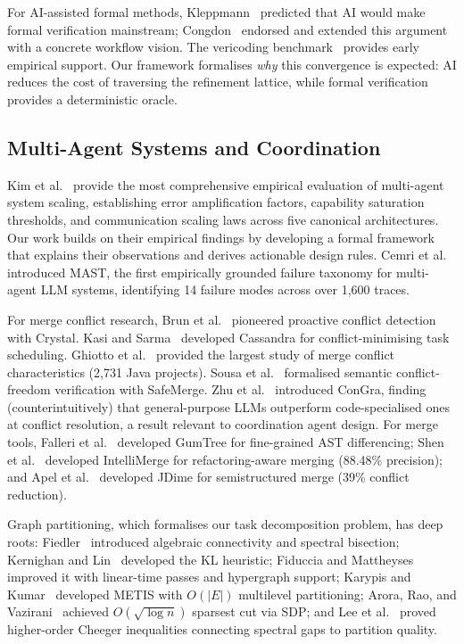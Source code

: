 \documentclass[11pt, a4paper]{googledeepmind}
\begin{document}
For AI-assisted formal methods, Kleppmann~\citep{kleppmann2025formal} predicted
that AI would make formal verification mainstream;
Congdon~\citep{congdon2025formal} endorsed and extended this argument with a
concrete workflow vision.  The vericoding benchmark~\citep{vericoding2025}
provides early empirical support.  Our framework formalises \emph{why} this
convergence is expected: AI reduces the cost of traversing the refinement
lattice, while formal verification provides a deterministic oracle.


\subsection{Multi-Agent Systems and Coordination}

Kim et al.~\citep{kim2025scaling} provide the most comprehensive empirical
evaluation of multi-agent system scaling, establishing error amplification
factors, capability saturation thresholds, and communication scaling laws across
five canonical architectures.  Our work builds on their empirical findings by
developing a formal framework that explains their observations and derives
actionable design rules.  Cemri et al.~\citep{cemri2025multiagent} introduced MAST, the
first empirically grounded failure taxonomy for multi-agent LLM systems,
identifying 14 failure modes across over 1,600 traces.

For merge conflict research, Brun et al.~\citep{Brun2011} pioneered proactive
conflict detection with Crystal.  Kasi and Sarma~\citep{KasiSarma2013}
developed Cassandra for conflict-minimising task scheduling.  Ghiotto
et al.~\citep{Ghiotto2018} provided the largest study of merge conflict
characteristics (2,731 Java projects).  Sousa et al.~\citep{Sousa2018}
formalised semantic conflict-freedom verification with SafeMerge.  Zhu
et al.~\citep{Zhu2024congra} introduced ConGra, finding (counterintuitively)
that general-purpose LLMs outperform code-specialised ones at conflict
resolution, a result relevant to coordination agent design.  For merge tools,
Falleri et al.~\citep{Falleri2014} developed GumTree for fine-grained AST
differencing; Shen et al.~\citep{Shen2019} developed IntelliMerge for
refactoring-aware merging (88.48\% precision); and Apel et al.~\citep{Apel2012}
developed JDime for semistructured merge (39\% conflict reduction).

Graph partitioning, which formalises our task decomposition problem, has deep
roots: Fiedler~\citep{Fiedler1973} introduced algebraic connectivity and
spectral bisection; Kernighan and Lin~\citep{KernighanLin1970} developed the KL
heuristic; Fiduccia and Mattheyses~\citep{FiducciaMattheyses1982} improved it
with linear-time passes and hypergraph support; Karypis and
Kumar~\citep{KarypisKumar1998} developed METIS with $O(|E|)$ multilevel
partitioning; Arora, Rao, and Vazirani~\citep{AroraRaoVazirani2009} achieved
$O(\sqrt{\log n})$ sparsest cut via SDP; and Lee et al.~\citep{Lee2012cheeger}
proved higher-order Cheeger inequalities connecting spectral gaps to partition
quality.
\end{document}
